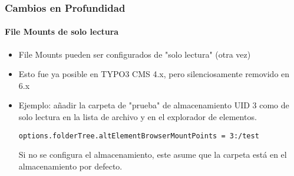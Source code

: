 
\begin{frame}[fragile]
	\frametitle{Cambios en Profundidad}
	\framesubtitle{File Mounts de solo lectura}

	\begin{itemize}

		\item File Mounts pueden ser configurados de "solo lectura" (otra vez)
		\item Esto fue ya posible en TYPO3 CMS 4.x, pero silenciosamente removido en 6.x
		\item Ejemplo: añadir la carpeta de "prueba" de almacenamiento UID 3 como de solo lectura en la lista de archivo y en el explorador de elementos.\newline

			\smaller\texttt{options.folderTree.altElementBrowserMountPoints = 3:/test}\normalsize\newline

			Si no se configura el almacenamiento, este asume que la carpeta está en el almacenamiento por defecto.
	\end{itemize}

\end{frame}



